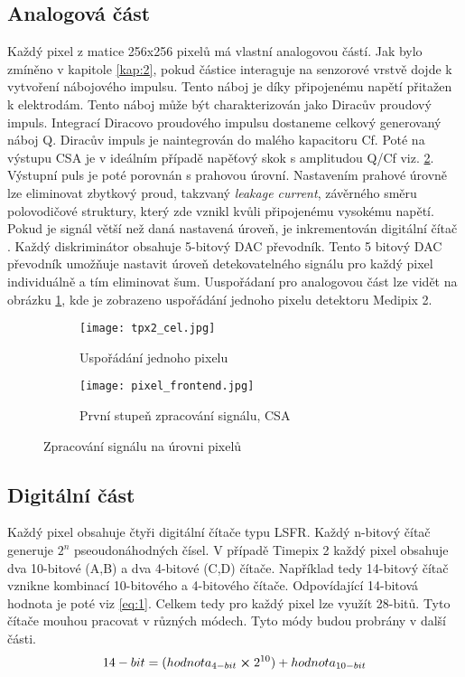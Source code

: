 \subsection{Analogová část}	 %
Každý pixel z matice 256x256 pixelů má vlastní analogovou částí. Jak bylo zmíněno v kapitole \ref{kap:2}, pokud částice interaguje na senzorové vrstvě dojde k vytvoření nábojového impulsu. Tento náboj je díky připojenému napětí přitažen k elektrodám. Tento náboj může být charakterizován jako Diracův proudový impuls. Integrací Diracovo proudového impulsu dostaneme celkový generovaný náboj Q. Diracův impuls je naintegrován do malého kapacitoru Cf. Poté na výstupu CSA je v ideálním případě napěťový skok s amplitudou Q/Cf viz. \ref{fig:pixel_frontend}. Výstupní puls je poté porovnán s prahovou úrovní. Nastavením prahové úrovně lze eliminovat zbytkový proud, takzvaný \textit{leakage current}, závěrného směru polovodičové struktury, který zde vznikl kvůli připojenému vysokému napětí. Pokud je signál větší než daná nastavená úroveň, je inkrementován digitální čítač \cite{Llopart}. Každý diskriminátor obsahuje 5-bitový DAC převodník. Tento 5 bitový DAC převodník umožňuje nastavit úroveň detekovatelného signálu pro každý pixel individuálně a tím eliminovat šum. Uuspořádaní pro analogovou část lze vidět na obrázku \ref{fig:tpx2_cel}, kde je zobrazeno uspořádání jednoho pixelu detektoru Medipix 2.
\begin{figure}[h!]
	\begin{subfigure}{0.5\textwidth}
	\centering
	\captionsetup{justification=centering}
	\texttt{[image: tpx2\_cel.jpg]}
	\caption{Uspořádání jednoho pixelu} 
	\label{fig:tpx2_cel}
	\end{subfigure}
	\begin{subfigure}{0.5\textwidth}
		\centering
		\texttt{[image: pixel\_frontend.jpg]}
		\caption{První stupeň zpracování signálu, CSA}
		\label{fig:pixel_frontend}
	\end{subfigure}
	\caption{Zpracování signálu na úrovni pixelů}
	\label{fig:zpracování signálu}
\end{figure}

\subsection{Digitální část}
\label{Digitálni cast}
Každý pixel obsahuje čtyři digitální čítače typu LSFR. Každý n-bitový čítač generuje $2^n$ pseoudonáhodných čísel. V případě Timepix 2 každý pixel obsahuje dva 10-bitové (A,B) a dva 4-bitové (C,D) čítače. Například tedy 14-bitový čítač vznikne kombinací 10-bitového a 4-bitového čítače. Odpovídající 14-bitová hodnota je poté viz \ref{eq:1}. Celkem tedy pro každý pixel lze využít 28-bitů. Tyto čítače mouhou pracovat v různých módech. Tyto módy budou probrány v další části.
\begin{equation}
	14-bit = (hodnota_{4-bit} \cross 2^{10}) + hodnota_{10-bit}
	\label{eq:1}
\end{equation}

